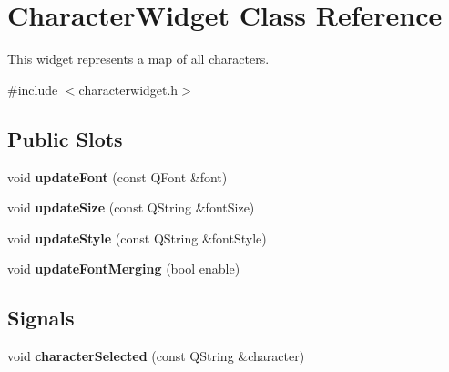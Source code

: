 \hypertarget{class_character_widget}{
\section{CharacterWidget Class Reference}
\label{class_character_widget}
}


This widget represents a map of all characters.  




{\ttfamily \#include $<$characterwidget.h$>$}

\subsection*{Public Slots}
\begin{DoxyCompactItemize}
\item 
\hypertarget{class_character_widget_ab2872cfa354bb192125e64ccbd649a7a}{
void {\bfseries updateFont} (const QFont \&font)}
\label{class_character_widget_ab2872cfa354bb192125e64ccbd649a7a}

\item 
\hypertarget{class_character_widget_a01464c2f021d49c91bf4a28fa6927d4c}{
void {\bfseries updateSize} (const QString \&fontSize)}
\label{class_character_widget_a01464c2f021d49c91bf4a28fa6927d4c}

\item 
\hypertarget{class_character_widget_a4647ae310c18a17d74e847c5d1ed0da9}{
void {\bfseries updateStyle} (const QString \&fontStyle)}
\label{class_character_widget_a4647ae310c18a17d74e847c5d1ed0da9}

\item 
\hypertarget{class_character_widget_a0ff657bdd2464e4186f8f08355f3655c}{
void {\bfseries updateFontMerging} (bool enable)}
\label{class_character_widget_a0ff657bdd2464e4186f8f08355f3655c}

\end{DoxyCompactItemize}
\subsection*{Signals}
\begin{DoxyCompactItemize}
\item 
\hypertarget{class_character_widget_a51ed5c78bef39717e9c8424c023d879b}{
void {\bfseries characterSelected} (const QString \&character)}
\label{class_character_widget_a51ed5c78bef39717e9c8424c023d879b}

\end{DoxyCompactItemize}
